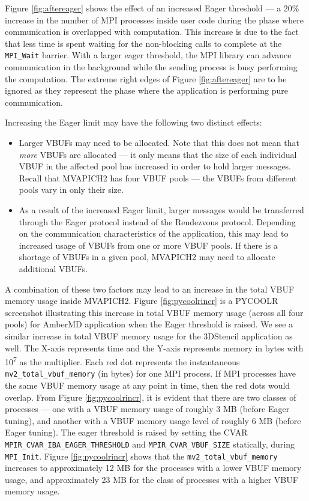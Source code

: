 \par Figure \ref{fig:aftereager} shows the effect of an increased Eager threshold --- a 20\% increase in the number of MPI processes inside user code during the phase where communication is overlapped with computation. This increase is due to the fact that less time is spent waiting for the non-blocking calls to complete at the \verb+MPI_Wait+ barrier. With a larger eager threshold, the MPI library can advance communication in the background while the sending process is busy performing the computation. The extreme right edges of Figure \ref{fig:aftereager} are to be ignored as they represent the phase where the application is performing pure communication.\par
Increasing the Eager limit may have the following two distinct effects:
\begin{itemize}
\item Larger VBUFs may need to be allocated. Note that this does not mean that \textit{more} VBUFs are allocated --- it only means that the size of each individual VBUF in the affected pool has increased in order to hold larger messages. Recall that MVAPICH2 has four VBUF pools --- the VBUFs from different pools vary in only their size. 
\item As a result of the increased Eager limit, larger messages would be transferred through the Eager protocol instead of the Rendezvous protocol. Depending on the communication characteristics of the application, this may lead to increased usage of VBUFs from one or more VBUF pools. If there is a shortage of VBUFs in a given pool, MVAPICH2 may need to allocate additional VBUFs.
\end{itemize}

A combination of these two factors may lead to an increase in the total VBUF memory usage inside MVAPICH2. Figure \ref{fig:pycoolrincr} is a PYCOOLR screenshot illustrating this increase in total VBUF memory usage (across all four pools) for AmberMD application when the Eager threshold is raised. We see a similar increase in total VBUF memory usage for the 3DStencil application as well. The X-axis represents time and the Y-axis represents memory in bytes with 10\textsuperscript{7} as the multiplier. Each red dot represents the instantaneous \verb+mv2_total_vbuf_memory+ (in bytes) for one MPI process. If MPI processes have the same VBUF memory usage at any point in time, then the red dots would overlap. From Figure \ref{fig:pycoolrincr}, it is evident that there are two classes of processes --- one with a VBUF memory usage of roughly 3 MB (before Eager tuning), and another with a VBUF memory usage level of roughly 6 MB (before Eager tuning). The eager threshold is raised by setting the CVAR \verb+MPIR_CVAR_IBA_EAGER_THRESHOLD+ and \verb+MPIR_CVAR_VBUF_SIZE+ statically, during \verb+MPI_Init+. Figure \ref{fig:pycoolrincr} shows that the \verb+mv2_total_vbuf_memory+ increases to approximately 12 MB for the processes with a lower VBUF memory usage, and approximately 23 MB for the class of processes with a higher VBUF memory usage.

